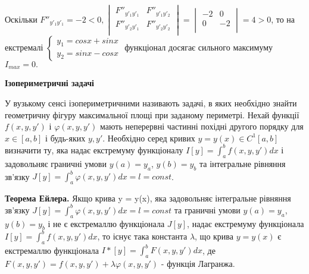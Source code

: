 \documentclass[a4paper]{article}
\begin{document}
		Оскільки $F''_{y'_1y'_1} = -2 < 0,
		\begin{vmatrix}
  			F''_{y'_1y'_1} & F''_{y'_1y'_2} \\
  			F''_{y'_2y'_1} & F''_{y'_2y'_2} \\
        \end{vmatrix} =
 		\begin{vmatrix}
  			-2 & 0 \\
  			0 & -2 \\
        \end{vmatrix} = 4 > 0 $, то на екстремалі
        $\begin{cases}
			y_1 = cosx + sinx  \\
			y_2 = sinx - cosx
		\end{cases}$ функціонал досягає сильного максимуму $I_{max}= 0.$
		
		\begin{center}
	      	\textbf{Ізопериметричні задачі}
	     \end{center}
	     У вузькому сенсі ізопериметричними називають задачі, в яких необхідно знайти геометричну 		фігуру максимальної площі при заданому периметрі. Нехай функції $f(x, y, y')$ і $\varphi(x, y, y')$ мають неперервні частинні похідні  другого порядку для $x \in [a,b]$ і будь-яких $y, y'$. Необхідно серед кривих $y = y(x) \in C^{1}[a, b]$ визначити ту, яка надає екстремуму функціоналу $I[y] = \int_{a}^{b} f(x, y, y')dx$ і задовольняє граничні умови $y(a) = y_a$, $y(b) = y_b$ та інтегральне рівняння зв’язку $J[y] = \int_{a}^{b} \varphi(x, y, y')dx = l = const$.

	     
	     \textbf{Теорема Ейлера.}
	     	Якщо крива y = y(x), яка задовольняє інтегральне рівняння зв’язку $J[y] = \int_{a}^{b} \varphi(x, y, y')dx = l = const$ та граничні умови  $y(a) = y_a$, $y(b) = y_b$ і не є екстремаллю функціонала $J[y]$, надає екстремуму функціонала $I[y] = \int_{a}^{b} f(x, y, y')dx$, то існує така константа $\lambda$, що крива $y = y(x)$ є екстремаллю функціонала $I*[y] = \int_{a}^{b} F(x, y, y')dx$, де $F(x, y, y') = f(x, y, y') + \lambda \varphi(x, y , y')$ - функція Лагранжа.
	     
\end{document}
